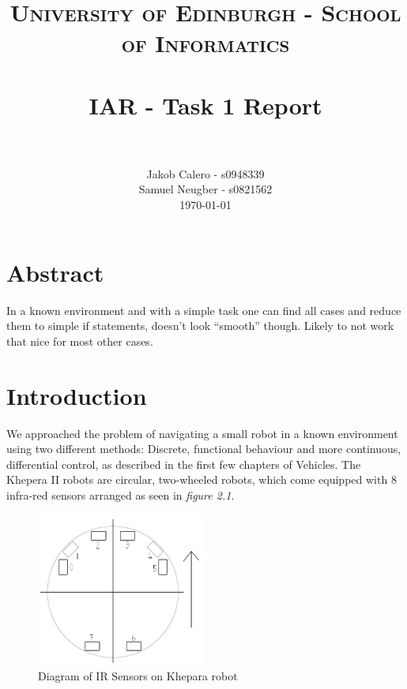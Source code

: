 \documentclass[paper=a4, fontsize=12pt]{scrartcl}	%
\title{
\vspace{-1in} 	
\usefont{OT1}{bch}{b}{n}
\normalfont \normalsize \textsc{University of Edinburgh - School of Informatics} \\ [25pt]
\horrule{0.5pt} \\[0.4cm]
\large IAR - Task 1 Report \\
\horrule{1pt} \\[0.5cm]
}
\author{
  \normalfont \normalsize
  Jakob Calero - s0948339\\[-3pt]\normalsize
  Samuel Neugber - s0821562\\[-3pt]\normalsize
  \today
}
\date{}
\numberwithin{equation}{section}		%
\numberwithin{figure}{section}			%
\numberwithin{table}{section}				%
\begin{document}
\maketitle					%
\section{Abstract}
In a known environment and with a simple task one can find all cases and reduce them to simple if statements, doesn't look “smooth” though. Likely to not work that nice for most other cases.

\section{Introduction}
We approached the problem of navigating a small robot in a known environment using two different methods: Discrete, functional behaviour and more continuous, differential control, as described in the first few chapters of Vehicles\cite{vehicles}. The Khepera II robots are circular, two-wheeled robots, which come equipped with 8 infra-red sensors arranged as seen in \emph{figure 2.1}. 
\begin{figure}[!ht]
 \centering
  \includegraphics[width=0.5\textwidth]{IRSensors}
  \caption{Diagram of IR Sensors on Khepara robot}
\end{figure}
\end{document}
